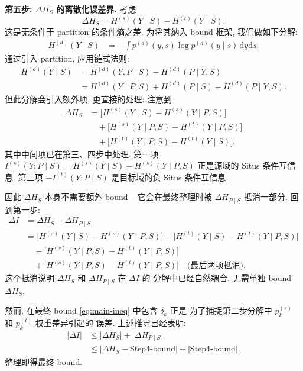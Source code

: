 \documentclass[12pt,a4paper]{article}
\begin{document}
\medskip\noindent
\textbf{第五步: $\Delta H_S$ 的离散化误差界.}
考虑
\begin{equation}\label{eq:step5a}
    \Delta H_S = H^{(s)}(Y\mid S) - H^{(t)}(Y\mid S).
\end{equation}
这是无条件于 partition 的条件熵之差. 为将其纳入 bound 框架,
我们做如下分解:
\begin{align*}
    H^{(d)}(Y\mid S) &= -\int p^{(d)}(y,s)\log p^{(d)}(y\mid s)
                       \,\mathrm{d}y\mathrm{d}s.
\end{align*}
通过引入 partition, 应用链式法则:
\begin{align*}
    H^{(d)}(Y\mid S) &= H^{(d)}(Y,P\mid S) - H^{(d)}(P\mid Y,S) \\
                     &= H^{(d)}(Y\mid P,S) + H^{(d)}(P\mid S)
                        - H^{(d)}(P\mid Y,S).
\end{align*}
但此分解会引入额外项. 更直接的处理: 注意到
\begin{align*}
    \Delta H_S &= \bigl[H^{(s)}(Y\mid S) - H^{(s)}(Y\mid P,S)\bigr] \\
              &\quad + \bigl[H^{(s)}(Y\mid P,S) - H^{(t)}(Y\mid P,S)\bigr] \\
              &\quad + \bigl[H^{(t)}(Y\mid P,S) - H^{(t)}(Y\mid S)\bigr].
\end{align*}
其中中间项已在第三、四步中处理. 第一项
$I^{(s)}(Y;P\mid S)=H^{(s)}(Y\mid S)-H^{(s)}(Y\mid P,S)$ 正是源域的
Situs 条件互信息. 第三项 $-I^{(t)}(Y;P\mid S)$ 是目标域的负 Situs 条件互信息.

因此 $\Delta H_S$ 本身不需要额外 bound -- 它会在最终整理时被
$\Delta H_{P\mid S}$ 抵消一部分. 回到第一步:
\begin{align*}
    \Delta I &= \Delta H_S - \Delta H_{P\mid S} \\
    &= \bigl[H^{(s)}(Y\mid S)-H^{(s)}(Y\mid P,S)\bigr]
       - \bigl[H^{(t)}(Y\mid S)-H^{(t)}(Y\mid P,S)\bigr] \\
    &\quad - \bigl[H^{(s)}(Y\mid P,S)-H^{(t)}(Y\mid P,S)\bigr] \\
    &\quad + \bigl[H^{(s)}(Y\mid P,S)-H^{(t)}(Y\mid P,S)\bigr]
       \quad\text{(最后两项抵消)}.
\end{align*}
这个抵消说明 $\Delta H_S$ 和 $\Delta H_{P\mid S}$ 在 $\Delta I$ 的
分解中已经自然耦合, 无需单独 bound $\Delta H_S$.

然而, 在最终 bound \eqref{eq:main-ineq} 中包含 $\delta_k$ 正是
为了捕捉第二步分解中 $p^{(s)}_k$ 和 $p^{(t)}_k$ 权重差异引起的
误差. 上述推导已经表明:
\begin{align*}
    |\Delta I| &\leq \bigl|\Delta H_S\bigr| + \bigl|\Delta H_{P\mid S}\bigr| \\
    &\leq \bigl|\Delta H_S - \text{Step4-bound}\bigr|
          + \bigl|\text{Step4-bound}\bigr|.
\end{align*}
整理即得最终 bound. \checkmark
\end{document}

